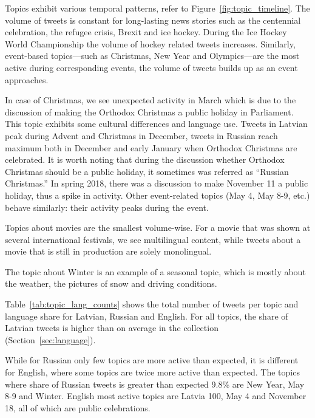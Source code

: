 \documentclass{IOS-Book-Article}
\newcommand{\hl}[1]{#1}
\begin{document}

Topics exhibit various temporal patterns, refer to Figure~\ref{fig:topic_timeline}. The volume of tweets is constant for long-lasting news stories such as the centennial celebration, the refugee crisis, Brexit and ice hockey.
%
During the Ice Hockey World Championship the volume of hockey related tweets increases. Similarly, event-based topics---such as Christmas, New Year and Olympics---are the most active during corresponding events, the volume of tweets builds up as an event approaches.

In case of Christmas, we see unexpected activity in March which is due to the discussion of making the Orthodox Christmas a public holiday in Parliament. This topic exhibits some cultural differences and language use. Tweets in Latvian peak during Advent and Christmas in December, tweets in Russian reach maximum both in December and early January when Orthodox Christmas are celebrated. It is worth noting that during the discussion whether Orthodox Christmas should be a public holiday, it sometimes was referred as ``Russian Christmas.'' In spring 2018, there was a discussion to make November 11 a public holiday, thus a spike in activity. Other event-related topics (May 4, May 8-9, etc.) behave similarly: their activity peaks during the event.

Topics about movies are the smallest volume-wise. For a movie that was shown at several international festivals, we see multilingual content, while tweets about a movie that is still in production are solely monolingual.

The topic about Winter is an example of a seasonal topic, which is mostly about the weather, the pictures of snow and driving conditions.

Table~\ref{tab:topic_lang_counts} shows the total number of tweets per topic and language share for Latvian, Russian and English. For \hl{all topics}, the share of Latvian tweets is higher than on average in the collection (Section~\ref{sec:language}).

While for Russian only few topics are more active than expected, it is different for English, where some topics are twice more active than expected. The topics where share of Russian tweets is greater than expected \hl{9.8\%} are New Year, May 8-9 and Winter. English most active topics are Latvia 100, May 4 and November 18, all of which are public celebrations. 
\end{document}

